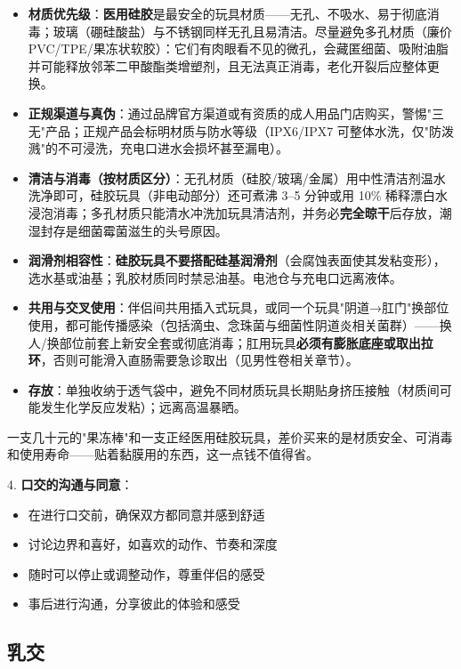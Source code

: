 \documentclass[12pt,UTF8]{ctexbook}
\begin{document}
\begin{itemize}
	\item \textbf{材质优先级}：\textbf{医用硅胶}是最安全的玩具材质——无孔、不吸水、易于彻底消毒；玻璃（硼硅酸盐）与不锈钢同样无孔且易清洁。尽量避免多孔材质（廉价 PVC/TPE/果冻状软胶）：它们有肉眼看不见的微孔，会藏匿细菌、吸附油脂并可能释放邻苯二甲酸酯类增塑剂，且无法真正消毒，老化开裂后应整体更换。
	\item \textbf{正规渠道与真伪}：通过品牌官方渠道或有资质的成人用品门店购买，警惕"三无"产品；正规产品会标明材质与防水等级（IPX6/IPX7 可整体水洗，仅"防泼溅"的不可浸洗，充电口进水会损坏甚至漏电）。
	\item \textbf{清洁与消毒（按材质区分）}：无孔材质（硅胶/玻璃/金属）用中性清洁剂温水洗净即可，硅胶玩具（非电动部分）还可煮沸 3--5 分钟或用 10\% 稀释漂白水浸泡消毒；多孔材质只能清水冲洗加玩具清洁剂，并务必\textbf{完全晾干}后存放，潮湿封存是细菌霉菌滋生的头号原因。
	\item \textbf{润滑剂相容性}：\textbf{硅胶玩具不要搭配硅基润滑剂}（会腐蚀表面使其发粘变形），选水基或油基；乳胶材质同时禁忌油基。电池仓与充电口远离液体。
	\item \textbf{共用与交叉使用}：伴侣间共用插入式玩具，或同一个玩具"阴道→肛门"换部位使用，都可能传播感染（包括滴虫、念珠菌与细菌性阴道炎相关菌群）——换人/换部位前套上新安全套或彻底消毒；肛用玩具\textbf{必须有膨胀底座或取出拉环}，否则可能滑入直肠需要急诊取出（见男性卷相关章节）。
	\item \textbf{存放}：单独收纳于透气袋中，避免不同材质玩具长期贴身挤压接触（材质间可能发生化学反应发粘）；远离高温暴晒。
\end{itemize}

\begin{tcolorbox}[colback=pink!5!white,colframe=red!50!black,title=贴心小叮咛]
	一支几十元的"果冻棒"和一支正经医用硅胶玩具，差价买来的是材质安全、可消毒和使用寿命——贴着黏膜用的东西，这一点钱不值得省。
\end{tcolorbox}

4. \textbf{口交的沟通与同意}：
\begin{itemize}
	\item 在进行口交前，确保双方都同意并感到舒适
	\item 讨论边界和喜好，如喜欢的动作、节奏和深度
	\item 随时可以停止或调整动作，尊重伴侣的感受
	\item 事后进行沟通，分享彼此的体验和感受
\end{itemize}

\subsection{乳交}
\end{document}
